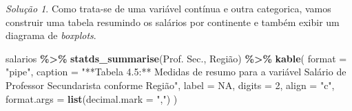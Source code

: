 \documentclass[
]{latex/krantz}
\newenvironment{Shaded}{\begin{snugshade}}{\end{snugshade}}
\newcommand{\AttributeTok}[1]{\textcolor[rgb]{0.13,0.29,0.53}{#1}}
\newcommand{\ConstantTok}[1]{\textcolor[rgb]{0.56,0.35,0.01}{#1}}
\newcommand{\DecValTok}[1]{\textcolor[rgb]{0.00,0.00,0.81}{#1}}
\newcommand{\FunctionTok}[1]{\textcolor[rgb]{0.13,0.29,0.53}{\textbf{#1}}}
\newcommand{\NormalTok}[1]{#1}
\newcommand{\SpecialCharTok}[1]{\textcolor[rgb]{0.81,0.36,0.00}{\textbf{#1}}}
\newcommand{\StringTok}[1]{\textcolor[rgb]{0.31,0.60,0.02}{#1}}
\theoremstyle{definition}
\theoremstyle{definition}
\theoremstyle{definition}
\theoremstyle{definition}
\theoremstyle{remark}
\newtheorem*{solution}{Solução}
\begin{document}
\begin{solution}
Como trata-se de uma variável contínua e outra categorica, vamos construir uma tabela resumindo os salários por continente e também exibir um diagrama de \emph{boxplots}.

\begin{Shaded}
\begin{Highlighting}[]
\NormalTok{salarios }\SpecialCharTok{\%\textgreater{}\%}
  \FunctionTok{statds\_summarise}\NormalTok{(}\StringTok{\textasciigrave{}}\AttributeTok{Prof. Sec.}\StringTok{\textasciigrave{}}\NormalTok{, }\StringTok{\textasciigrave{}}\AttributeTok{Região}\StringTok{\textasciigrave{}}\NormalTok{) }\SpecialCharTok{\%\textgreater{}\%}
  \FunctionTok{kable}\NormalTok{(}
    \AttributeTok{format =} \StringTok{"pipe"}\NormalTok{,}
    \AttributeTok{caption =} \StringTok{"**Tabela 4.5:** Medidas de resumo para a variável \textasciigrave{}Salário de Professor Secundarista\textasciigrave{} conforme \textasciigrave{}Região\textasciigrave{}"}\NormalTok{,}
    \AttributeTok{label =} \ConstantTok{NA}\NormalTok{,}
    \AttributeTok{digits =} \DecValTok{2}\NormalTok{,}
    \AttributeTok{align =} \StringTok{"c"}\NormalTok{,}
    \AttributeTok{format.args =} \FunctionTok{list}\NormalTok{(}\AttributeTok{decimal.mark =} \StringTok{","}\NormalTok{)}
\NormalTok{  )}
\end{Highlighting}
\end{Shaded}


\end{solution}
\end{document}
